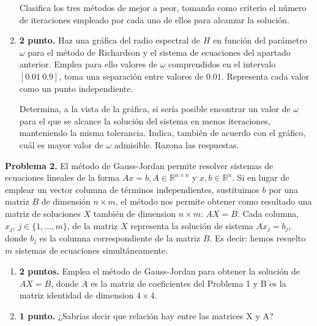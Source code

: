 \begin{enumerate}
Clasifica los tres métodos de mejor a peor, tomando como criterio el número de iteraciones empleado por cada uno de ellos para alcanzar la solución.


\item {\bf 2 punto.} Haz una gráfica del radio espectral de $H$ en función del parámetro $\omega$ para el método de Richardson y el sistema de ecuaciones del apartado anterior. Emplea para ello valores de $\omega$ comprendidos en el intervalo $[0.01\ 0.9]$, toma una separación entre valores de $0.01$.  Representa cada valor como un punto independiente.

Determina, a la vista de la gráfica, si sería posible encontrar un valor de $\omega$ para el que se alcance la solución del sistema en menos iteraciones, manteniendo la misma tolerancia. Indica, también de acuerdo con el gráfico, cuál es mayor valor de $\omega$ admisible. Razona las respuestas.
\end{enumerate}

\noindent \textbf{Problema 2.} El método de Gauss-Jordan permite resolver sistemas de ecuaciones lineales de la forma $Ax =b, A \in \mathbb{R}^{n\times n}$ y $x,b  \in \mathbb{R}^{n}$. Si en lugar de emplear un vector columna de términos independientes, sustituimos $b$ por una matriz $B$ de dimensión $n\times m$, el método nos permite obtener como resultado una matriz de soluciones $X$ también de dimension  $n\times m$: $AX=B$. Cada columna, $x_j, \, j\in\{1,\dots,m\}$, de la matriz $X$ representa la solución de sistema $Ax_j=b_j$, donde $b_j$ es la columna correspondiente de la matriz $B$. Es decir: hemos resuelto $m$ sistemas de ecuaciones simultáneamente.

\begin{enumerate}
\item {\bf 2 puntos.} Emplea el método de Gauss-Jordan para obtener la solución de $AX=B$, donde $A$ es la matriz de coeficientes del Problema 1 y B es la matriz identidad de dimension $4\times4$.
\item {\bf 1 punto.} ¿Sabrías decir que relación hay entre las matrices X y A?
\end{enumerate}



